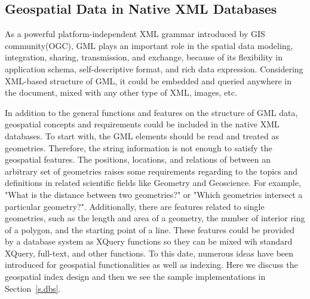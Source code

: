 \documentclass[a4paper,12pt]{article}
\begin{document}
\subsection{Geospatial Data in Native XML Databases}
\label{s.geo-data-in-xml-data}
As a powerful platform-independent XML grammar introduced by GIS community(OGC), GML plays an important role in the spatial data modeling, integration, sharing, transmission, and exchange, because of its flexibility in application schema, self-descriptive format, and rich data expression. Considering XML-based structure of GML, it could be embedded and queried anywhere in the document, mixed with any other type of XML, images, etc. 

In addition to the general functions and features on the structure of GML data, geospatial concepts and requirements could be included in the native XML databases. To start with, the GML elements should be read and treated as geometries. Therefore, the string information is not enough to satisfy the geospatial features. The positions, locations, and relations of between an arbitrary set of geometries raises some requirements regarding to the topics and definitions in related scientific fields like Geometry and Geoscience. For example, "What is the distance between two geometries?" or "Which geometries intersect a particular geometry?". Additionally, there are features related to single geometries, such as the length and area of a geometry, the number of interior ring of a polygon, and the starting point of a line. These features could be provided by a database system as XQuery functions so they can be mixed wih standard XQuery, full-text, and other functions.
To this date, numerous ideas have been introduced for geospatial functionalities as well as indexing. Here we discuss the geospatial index design and then we see the sample implementations in Section~\ref{s.dbs}.


\end{document}
